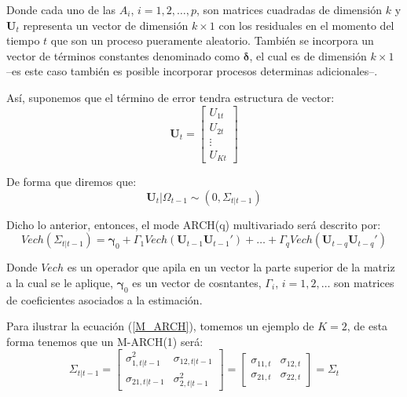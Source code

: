 \documentclass[
  a4paper,
]{article}
\begin{document}
Donde cada uno de las \(A_i\), \(i = 1, 2, \ldots, p\), son matrices
cuadradas de dimensión \(k\) y \(\mathbf{U}_t\) representa un vector de
dimensión \(k \times 1\) con los residuales en el momento del tiempo
\(t\) que son un proceso pueramente aleatorio. También se incorpora un
vector de términos constantes denominado como \(\mathbf{\delta}\), el
cual es de dimensión \(k \times 1\) --es este caso también es posible
incorporar procesos determinas adicionales--.

Así, suponemos que el término de error tendra estructura de vector:
\begin{equation*}
    \mathbf{U}_t = 
    \begin{bmatrix}
    U_{1t} \\ U_{2t} \\ \vdots \\ U_{Kt}
    \end{bmatrix}
\end{equation*}

De forma que diremos que: \begin{equation*}
    \mathbf{U}_t | \Omega_{t-1} \sim (0, \Sigma_{t | t-1})
\end{equation*}

Dicho lo anterior, entonces, el mode ARCH(q) multivariado será descrito
por: \[
    Vech(\Sigma_{t | t-1}) = \boldsymbol{\gamma}_0 + \Gamma_1 Vech(\mathbf{U}_{t-1} \mathbf{U}_{t-1}') + \ldots + \Gamma_q Vech(\mathbf{U}_{t-q} \mathbf{U}_{t-q}')
    \label{M_ARCH}
\]

Donde \(Vech\) es un operador que apila en un vector la parte superior
de la matriz a la cual se le aplique, \(\boldsymbol{\gamma}_0\) es un
vector de cosntantes, \(\Gamma_i\), \(i = 1, 2, \ldots\) son matrices de
coeficientes asociados a la estimación.

Para ilustrar la ecuación (\ref{M_ARCH}), tomemos un ejemplo de
\(K = 2\), de esta forma tenemos que un M-ARCH(1) será:
\begin{equation*}
    \Sigma_{t | t-1} = 
    \begin{bmatrix}
    \sigma^2_{1, t | t-1} & \sigma_{12, t | t-1} \\ \sigma_{21, t | t-1} & \sigma^2_{2, t | t-1}
    \end{bmatrix} = 
    \begin{bmatrix}
    \sigma_{11, t} & \sigma_{12, t} \\ \sigma_{21, t} & \sigma_{22, t}
    \end{bmatrix} =
    \Sigma_{t}
\end{equation*}
\end{document}
